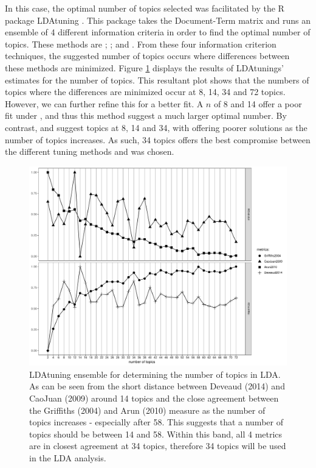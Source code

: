 In this case, the optimal number of topics selected was facilitated by the R package LDAtuning \citep{LDAtuning}. This package takes the Document-Term matrix and runs an ensemble of 4 different information criteria in order to find the optimal number of topics.  These methods are \cite{Arun2010}; \cite{CAO2009}; \cite{Griffiths2004} and \cite{deveaud2014}.  From these four information criterion techniques, the suggested number of topics occurs where differences between these methods are minimized. Figure \ref{fig:topicselection} displays the results of LDAtunings' estimates for the number of topics.  This resultant plot shows that the numbers of topics where the differences are minimized occur at 8, 14, 34 and 72 topics.  However, we can further refine this for a better fit.  A $n$ of 8 and 14 offer a poor fit under \cite{Griffiths2004}, and thus this method suggest a much larger optimal number.  By contrast, \cite{CAO2009} and \cite{deveaud2014} suggest topics at 8, 14 and 34, with \cite{deveaud2014} offering poorer solutions as the number of topics increases.  As such, 34 topics offers the best compromise between the different tuning methods and was chosen. 

\begin{figure}
	\centering
	\includegraphics[width=1\linewidth]{Figures/ChapterV/TopicSelection}
	\caption[LDAtuning Ensemble for Determining the Number of Topics in LDA]{LDAtuning ensemble for determining the number of topics in LDA.   As can be seen from the short distance between Deveaud (2014) and CaoJuan (2009) around 14 topics and the close agreement between the Griffiths (2004) and Arun (2010) measure as the number of topics increases - especially after 58.  This suggests that a number of topics should be between 14 and 58.  Within  this band, all 4 metrics are in closest agreement at 34 topics, therefore 34 topics will be used in the LDA analysis.    }
	\label{fig:topicselection}
\end{figure}

